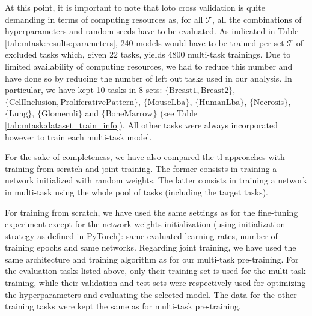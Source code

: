 At this point, it is important to note that \acrshort{loto} cross validation is quite demanding in terms of computing resources as, for all $\mathcal{T}$, all the combinations of hyperparameters and random seeds have to be evaluated. As indicated in Table \ref{tab:mtask:results:parameters}, 240 models would have to be trained per set $\mathcal{T}$ of excluded tasks which, given 22 tasks, yields 4800 multi-task trainings. Due to limited availability of computing resources, we had to reduce this number and have done so by reducing the number of left out tasks used in our analysis. In particular, we have kept 10 tasks in 8 sets: $\{\text{Breast1}, \text{Breast2}\}$, $\{\text{CellInclusion}, \text{ProliferativePattern}\}$, $\{\text{MouseLba}\}$, $\{\text{HumanLba}\}$, $\{\text{Necrosis}\}$, $\{\text{Lung}\}$, $\{\text{Glomeruli}\}$ and $\{\text{BoneMarrow}\}$ (see Table \ref{tab:mtask:dataset_train_info}). All other tasks were always incorporated however to train each multi-task model.

For the sake of completeness, we have also compared the \acrlong{tl} approaches with training from scratch and joint training. The former consists in training a network initialized with random weights. The latter consists in training a network in multi-task using the whole pool of tasks (including the target tasks). 

For training from scratch, we have used the same settings as for the fine-tuning experiment except for the network weights initialization (using initialization strategy as defined in PyTorch): same evaluated learning rates, number of training epochs and same networks. Regarding joint training, we have used the same architecture and training algorithm as for our multi-task pre-training. For the evaluation tasks listed above, only their training set is used for the multi-task training, while their validation and test sets were respectively used for optimizing the hyperparameters and evaluating the selected model. The data for the other training tasks were kept the same as for multi-task pre-training.

